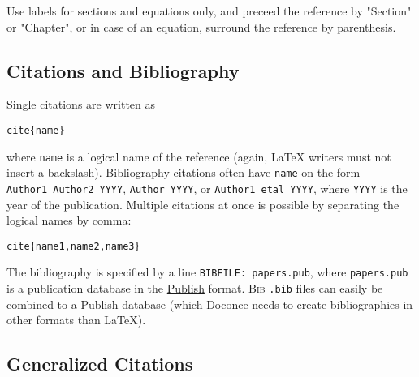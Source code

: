 \documentclass[%
oneside,                 %
final,                   %
10pt]{article}
\begin{document}
Use labels for sections and equations only, and preceed the reference
by "Section" or "Chapter", or in case of an equation, surround the
reference by parenthesis.


\subsection{Citations and Bibliography}

Single citations are written as
\begin{Verbatim}[numbers=none,fontsize=\fontsize{9pt}{9pt},baselinestretch=0.85,xleftmargin=0mm]
cite{name}
\end{Verbatim}
where \Verb!name! is a logical name
of the reference (again, {\LaTeX} writers must not insert a backslash).
Bibliography citations often have \Verb!name! on the form
\Verb!Author1_Author2_YYYY!, \Verb!Author_YYYY!, or \Verb!Author1_etal_YYYY!, where
\Verb!YYYY! is the year of the publication.
Multiple citations at once is possible by separating the logical names
by comma:
\begin{Verbatim}[numbers=none,fontsize=\fontsize{9pt}{9pt},baselinestretch=0.85,xleftmargin=0mm]
cite{name1,name2,name3}
\end{Verbatim}

The bibliography is specified by a line \Verb!BIBFILE: papers.pub!,
where \Verb!papers.pub! is a publication database in the
\href{{https://bitbucket.org/logg/publish}}{Publish} format.
\textsc{Bib}\negthinspace{\TeX} \Verb!.bib! files can easily be combined to a Publish database
(which Doconce needs to create bibliographies in other formats
than {\LaTeX}).

\subsection{Generalized Citations}
\end{document}
